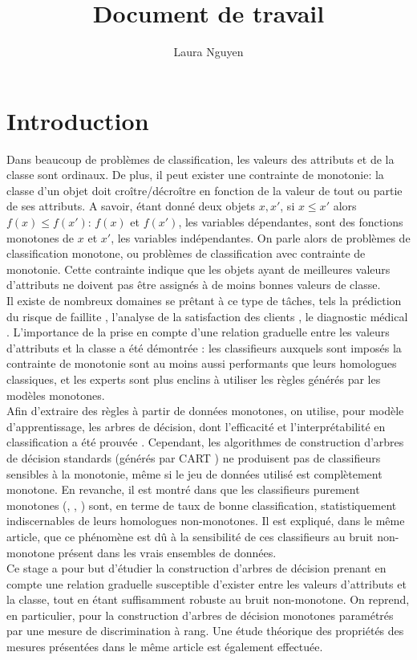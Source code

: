 \documentclass[a4paper]{article}
\title{Document de travail}
\author{Laura Nguyen}
\begin{document}
\maketitle

\section{Introduction}
    Dans beaucoup de problèmes de classification, les valeurs des attributs et de la classe sont ordinaux. De plus, il peut exister une contrainte de monotonie: la classe d'un objet doit croître/décroître en fonction de la valeur de tout ou partie de ses attributs. 
A savoir, étant donné deux objets $x, x'$, si $x \leq x'$ alors $f(x) \leq f(x')$: $f(x)$ et $f(x')$, les variables dépendantes, sont des fonctions monotones de $x$ et $x'$, les variables indépendantes.
On parle alors de problèmes de classification monotone, ou problèmes de classification avec contrainte de monotonie. Cette contrainte indique que les objets ayant de meilleures valeurs d'attributs ne doivent pas être assignés à de moins bonnes valeurs de classe.\\
Il existe de nombreux domaines se prêtant à ce type de tâches, tels la prédiction du risque de faillite \cite{greco-new-bankruptcy}, l'analyse de la satisfaction des clients \cite{greco-customer}, le diagnostic médical \cite{marsala-gradual}. 
L'importance de la prise en compte d'une relation graduelle entre les valeurs d'attributs et la classe a été démontrée \cite{pazzani-acceptance}: les classifieurs auxquels sont imposés la contrainte de monotonie sont au moins aussi performants que leurs homologues classiques, et les experts sont plus enclins à utiliser les règles générés par les modèles monotones.\\
Afin d'extraire des règles à partir de données monotones, on utilise, pour modèle d'apprentissage, les arbres de décision, dont l'efficacité et l'interprétabilité en classification a été prouvée \cite{quinlan-induction}.
Cependant, les algorithmes de construction d'arbres de décision standards (générés par CART \cite{leo-classification}) ne produisent pas de classifieurs sensibles à la monotonie, même si le jeu de données utilisé est complètement monotone. 
En revanche, il est montré dans \cite{ben-adding} que les classifieurs purement monotones (\cite{ben-learning}, \cite{ben-monotonicity}, \cite{cao-consistent}) sont, en terme de taux de bonne classification, statistiquement indiscernables de leurs homologues non-monotones. 
Il est expliqué, dans le même article, que ce phénomène est dû à la sensibilité de ces classifieurs au bruit non-monotone présent dans les vrais ensembles de données. \\
Ce stage a pour but d'étudier la construction d'arbres de décision prenant en compte une relation graduelle susceptible d'exister entre les valeurs d'attributs et la classe, tout en étant suffisamment robuste au bruit non-monotone. On reprend, en particulier, \cite{marsala-rank} pour la construction d'arbres de décision monotones paramétrés par une mesure de discrimination à rang. Une étude théorique des propriétés des mesures présentées dans le même article est également effectuée.\\
\end{document}
